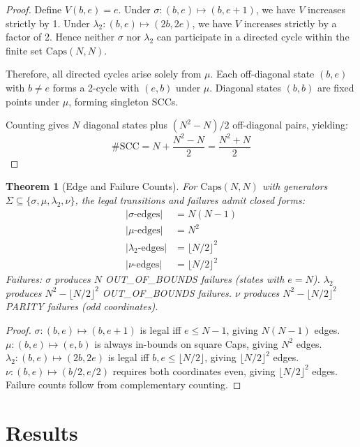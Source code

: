 \documentclass[11pt]{article}
\newtheorem{theorem}{Theorem}[section]
\theoremstyle{definition}
\begin{document}
\begin{proof}
Define $V(b,e) = e$. Under $\sigma: (b,e) \mapsto (b, e+1)$, we have $V$ increases strictly by 1. Under $\lambda_2: (b,e) \mapsto (2b, 2e)$, we have $V$ increases strictly by a factor of 2. Hence neither $\sigma$ nor $\lambda_2$ can participate in a directed cycle within the finite set $\mathrm{Caps}(N,N)$.

Therefore, all directed cycles arise solely from $\mu$. Each off-diagonal state $(b,e)$ with $b \neq e$ forms a 2-cycle with $(e,b)$ under $\mu$. Diagonal states $(b,b)$ are fixed points under $\mu$, forming singleton SCCs. 

Counting gives $N$ diagonal states plus $(N^2-N)/2$ off-diagonal pairs, yielding:
\[
\#\mathrm{SCC} = N + \frac{N^2-N}{2} = \frac{N^2+N}{2}
\]
\end{proof}

\begin{theorem}[Edge and Failure Counts]
\label{thm:edge_counts}
For $\mathrm{Caps}(N,N)$ with generators $\Sigma \subseteq \{\sigma, \mu, \lambda_2, \nu\}$, the legal transitions and failures admit closed forms:
\begin{align*}
|\sigma\text{-edges}| &= N(N-1) \\
|\mu\text{-edges}| &= N^2 \\
|\lambda_2\text{-edges}| &= \lfloor N/2 \rfloor^2 \\
|\nu\text{-edges}| &= \lfloor N/2 \rfloor^2
\end{align*}
Failures: $\sigma$ produces $N$ OUT\_OF\_BOUNDS failures (states with $e=N$). $\lambda_2$ produces $N^2 - \lfloor N/2 \rfloor^2$ OUT\_OF\_BOUNDS failures. $\nu$ produces $N^2 - \lfloor N/2 \rfloor^2$ PARITY failures (odd coordinates).
\end{theorem}

\begin{proof}
$\sigma: (b,e) \mapsto (b, e+1)$ is legal iff $e \le N-1$, giving $N(N-1)$ edges. $\mu: (b,e) \mapsto (e,b)$ is always in-bounds on square Caps, giving $N^2$ edges. $\lambda_2: (b,e) \mapsto (2b, 2e)$ is legal iff $b,e \le \lfloor N/2 \rfloor$, giving $\lfloor N/2 \rfloor^2$ edges. $\nu: (b,e) \mapsto (b/2, e/2)$ requires both coordinates even, giving $\lfloor N/2 \rfloor^2$ edges. Failure counts follow from complementary counting.
\end{proof}

\section{Results}
\label{sec:results}
\end{document}
